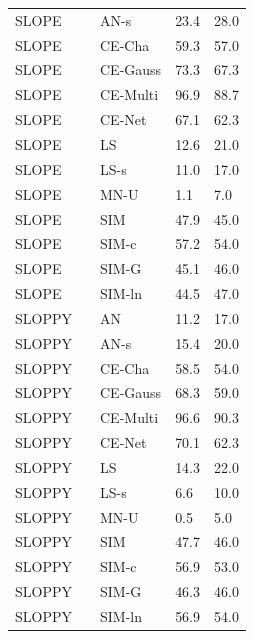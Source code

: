 \begin{tabular}{lllll}
SLOPE &  & AN-s & 23.4 & 28.0 \\
SLOPE &  & CE-Cha & 59.3 & 57.0 \\
SLOPE &  & CE-Gauss & 73.3 & 67.3 \\
SLOPE &  & CE-Multi & 96.9 & 88.7 \\
SLOPE &  & CE-Net & 67.1 & 62.3 \\
SLOPE &  & LS & 12.6 & 21.0 \\
SLOPE &  & LS-s & 11.0 & 17.0 \\
SLOPE &  & MN-U & 1.1 & 7.0 \\
SLOPE &  & SIM & 47.9 & 45.0 \\
SLOPE &  & SIM-c & 57.2 & 54.0 \\
SLOPE &  & SIM-G & 45.1 & 46.0 \\
SLOPE &  & SIM-ln & 44.5 & 47.0 \\
SLOPPY &  & AN & 11.2 & 17.0 \\
SLOPPY &  & AN-s & 15.4 & 20.0 \\
SLOPPY &  & CE-Cha & 58.5 & 54.0 \\
SLOPPY &  & CE-Gauss & 68.3 & 59.0 \\
SLOPPY &  & CE-Multi & 96.6 & 90.3 \\
SLOPPY &  & CE-Net & 70.1 & 62.3 \\
SLOPPY &  & LS & 14.3 & 22.0 \\
SLOPPY &  & LS-s & 6.6 & 10.0 \\
SLOPPY &  & MN-U & 0.5 & 5.0 \\
SLOPPY &  & SIM & 47.7 & 46.0 \\
SLOPPY &  & SIM-c & 56.9 & 53.0 \\
SLOPPY &  & SIM-G & 46.3 & 46.0 \\
SLOPPY &  & SIM-ln & 56.9 & 54.0 \\
\bottomrule
\end{tabular}
